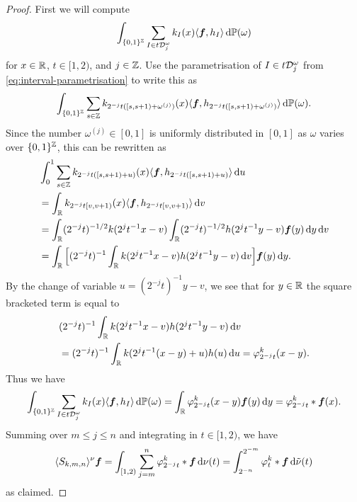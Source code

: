 \begin{proof}
  First we will compute
  \begin{equation*}
    \int_{\{0,1\}^{\mathbb{Z}}} \sum_{I \in t\mathcal{D}_{j}^{\omega}} k_{I}(x) \langle \bm{f}, h_{I} \rangle \, \mathrm{d}\mathbb{P}(\omega)
  \end{equation*}
  for $x \in \mathbb{R}$, $t \in [1,2)$, and $j \in \mathbb{Z}$.
  Use the parametrisation of $I \in t\mathcal{D}_{j}^{\omega}$ from \eqref{eq:interval-parametrisation} to write this as
  \begin{equation*}
    \int_{\{0,1\}^{\mathbb{Z}}} \sum_{s \in \mathbb{Z}} k_{2^{-j}t([s,s+1) + \omega^{(j)})}(x) \langle \bm{f}, h_{2^{-j}t([s,s+1) + \omega^{(j)})} \rangle \, \mathrm{d}\mathbb{P}(\omega).
  \end{equation*}
  Since the number $\omega^{(j)} \in [0,1]$ is uniformly distributed in $[0,1]$ as $\omega$ varies over $\{0,1\}^{\mathbb{Z}}$, this can be rewritten as
  \begin{equation*}
    \begin{aligned}
    &\int_{0}^{1} \sum_{s \in \mathbb{Z}} k_{2^{-j}t([s,s+1) + u)}(x) \langle \bm{f}, h_{2^{-j}t([s,s+1) + u)} \rangle \, \mathrm{d} u \\
    &= \int_{\mathbb{R}}  k_{2^{-j}t[v,v+1)}(x) \langle \bm{f}, h_{2^{-j}t[v,v+1)} \rangle \, \mathrm{d} v \\
    &= \int_{\mathbb{R}} (2^{-j} t)^{-1/2} k(2^{j} t^{-1} x - v)\int_{\mathbb{R}} (2^{-j} t)^{-1/2} h(2^{j} t^{-1} y - v)\bm{f}(y) \, \mathrm{d} y \, \mathrm{d} v \\
    &= \int_{\mathbb{R}} \Big[ (2^{-j} t)^{-1} \int_{\mathbb{R}} k(2^j t^{-1} x - v) h(2^j t^{-1} y - v) \, \mathrm{d} v \Big] \bm{f}(y) \, \mathrm{d} y .
  \end{aligned}
\end{equation*}
By the change of variable $u = (2^{-j}t)^{-1} y - v$, we see that for $y \in \mathbb{R}$ the square bracketed term is equal to
\begin{equation*}
  \begin{aligned}
    &(2^{-j} t)^{-1} \int_{\mathbb{R}} k(2^j t^{-1} x - v) h(2^j t^{-1} y - v) \, \mathrm{d} v \\
    &= (2^{-j} t)^{-1} \int_{\mathbb{R}} k(2^j t^{-1} (x-y) + u) h(u) \, \mathrm{d} u
    = \varphi_{2^{-j} t}^{k}(x-y).
  \end{aligned}
\end{equation*}
Thus we have
\begin{equation*}
  \int_{\{0,1\}^{\mathbb{Z}}} \sum_{I \in t\mathcal{D}_{j}^{\omega}} k_{I}(x) \langle \bm{f}, h_{I} \rangle \, \mathrm{d}\mathbb{P}(\omega)
  = \int_{\mathbb{R}} \varphi_{2^{-j} t}^{k}(x-y) \bm{f}(y) \, \mathrm{d} y
  = \varphi_{2^{-j} t}^{k} \ast \bm{f}(x).
\end{equation*}
Summing over $m \leq j \leq n$ and integrating in $t \in [1,2)$, we have
\begin{equation*}
  \langle S_{k,m,n} \rangle^{\nu} \bm{f} = \int_{[1,2)} \sum_{j=m}^{n} \varphi_{2^{-j} t}^{k} \ast \bm{f}   \, \mathrm{d}\nu(t) = \int_{2^{-n}}^{2^{-m}} \varphi^{k}_{t} \ast \bm{f} \, \mathrm{d}\tilde{\nu}(t)
\end{equation*}
as claimed.
\end{proof}

